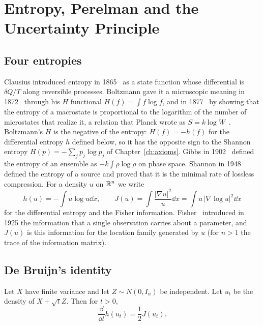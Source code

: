 \chapter{Entropy, Perelman and the Uncertainty Principle}
\label{ch:entropy}

\section{Four entropies}

Clausius introduced entropy in 1865~\cite{clausius1865} as a state function whose differential is $\delta Q/T$ along reversible processes. Boltzmann gave it a microscopic meaning in 1872~\cite{boltzmann1872} through his $H$ functional $H(f) = \int f\log f$, and in 1877~\cite{boltzmann1877} by showing that the entropy of a macrostate is proportional to the logarithm of the number of microstates that realize it, a relation that Planck wrote as $S = k\log W$~\cite{planck1901}. Boltzmann's $H$ is the negative of the entropy: $H(f) = -h(f)$ for the differential entropy $h$ defined below, so it has the opposite sign to the Shannon entropy $H(p) = -\sum_jp_j\log p_j$ of Chapter~\ref{ch:axioms}. Gibbs in 1902~\cite{gibbs1902} defined the entropy of an ensemble as $-k\int\rho\log\rho$ on phase space. Shannon in 1948~\cite{shannon1948} defined the entropy of a source and proved that it is the minimal rate of lossless compression. For a density $u$ on $\mathbb{R}^n$ we write
\[
h(u) = -\int u\log u\dd x,\qquad J(u) = \int\frac{|\nabla u|^2}{u}\dd x = \int u\,|\nabla\log u|^2\dd x
\]
for the differential entropy and the Fisher information. Fisher~\cite{fisher1925} introduced in 1925 the information that a single observation carries about a parameter, and $J(u)$ is this information for the location family generated by $u$ (for $n>1$ the trace of the information matrix).

\section{De Bruijn's identity}

\begin{theorem}[de Bruijn]
\label{thm:debruijn}
Let $X$ have finite variance and let $Z\sim N(0,I_n)$ be independent. Let $u_t$ be the density of $X+\sqrt t Z$. Then for $t>0$,
\[
\frac{\dd}{\dd t}h(u_t) = \frac12J(u_t).
\]
\end{theorem}

